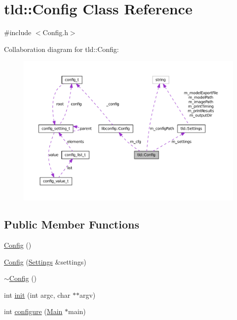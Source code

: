 \hypertarget{classtld_1_1_config}{
\section{tld::Config Class Reference}
\label{classtld_1_1_config}
}


{\ttfamily \#include $<$Config.h$>$}



Collaboration diagram for tld::Config:
\nopagebreak
\begin{figure}[H]
\begin{center}
\leavevmode
\includegraphics[width=400pt]{classtld_1_1_config__coll__graph}
\end{center}
\end{figure}
\subsection*{Public Member Functions}
\begin{DoxyCompactItemize}
\item 
\hyperlink{classtld_1_1_config_a41ed67defe7392fe1ecc3233ad2a7a62}{Config} ()
\item 
\hyperlink{classtld_1_1_config_ade40e6027fbdc054bd5772a5baa898ae}{Config} (\hyperlink{classtld_1_1_settings}{Settings} \&settings)
\item 
\hyperlink{classtld_1_1_config_a794ffe6627a441e41f22d368a279f2e5}{$\sim$Config} ()
\item 
int \hyperlink{classtld_1_1_config_ab2f2fb863b08832e2b877e6f09073333}{init} (int argc, char $\ast$$\ast$argv)
\item 
int \hyperlink{classtld_1_1_config_a920f1659e8823a127eca60b228da416a}{configure} (\hyperlink{class_main}{Main} $\ast$main)
\end{DoxyCompactItemize}


